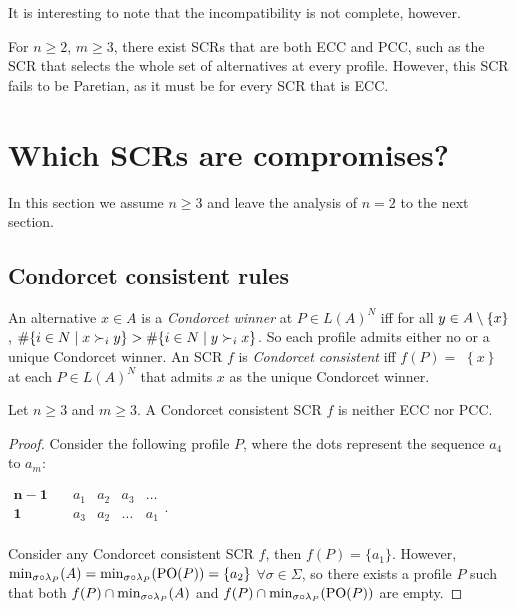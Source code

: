 \documentclass[version=3.21, pagesize, twoside=off, bibliography=totoc, DIV=calc, fontsize=12pt, a4paper]{scrartcl}
\begin{document}
It is interesting to note that the incompatibility is not complete, however.

\begin{remark}
	For $n ≥ 2$, $m ≥ 3$, there exist \acp{SCR} that are both ECC and PCC, such as the \ac{SCR} that selects the whole set of alternatives at every profile. However, this \ac{SCR} fails to be Paretian, as it must be for every \ac{SCR} that is ECC.
\end{remark}


\section{Which \acp{SCR} are compromises?}
\label{sec:more2voters}
In this section we assume $n\geq 3$ and leave the analysis of $n=2$ to the
next section.

\subsection{Condorcet consistent rules}

An alternative $x\in A$ is a \textit{Condorcet winner} at $P\in L(A)^{N}$ iff for all $y\in A \setminus \{x\} $, $\#\set{i \in N \suchthat x \prefi y} >\#\set{i \in N \suchthat y \prefi x}$. So each profile admits
either no or a unique Condorcet winner. An \ac{SCR} $f$ is \textit{Condorcet
consistent} iff $f(P)=$ $\left\{ x\right\} $ at each $P\in L(A)^{N}$ that
admits $x$ as the unique Condorcet winner.

\begin{theorem} \label{th:condorcet}
Let $n\geq 3$ and $m\geq 3$. A Condorcet consistent \ac{SCR} $f$ is neither ECC nor PCC.
\end{theorem}
\begin{proof}
Consider the following profile $P$, where the dots represent the sequence $a_4$ to $a_m$:
	\begin{center}
		$
		\begin{array}{cccccc}
		\mathbf{n-1} \quad &a_1&a_2&a_3&\dots\\
		\mathbf{1} \quad &a_3&a_2&\dots&a_1\\
		\end{array}
		$.
	\end{center}

Consider any Condorcet consistent \ac{SCR} $f$, then $f(P)=\{a_1\}$. However, $\musigma=\mustar=\{a_2\}$ $\forall \sigma \in \Sigma$, so there exists a profile $P$ such that both $f(P)\cap \musigma$ and $f(P)\cap \mustar$ are empty.
\end{proof}
\end{document}
